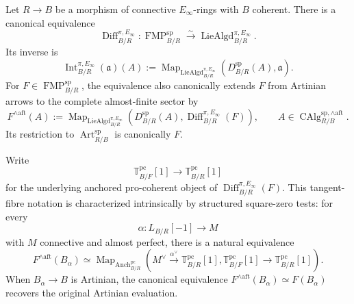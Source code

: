 \begin{theorem}
\label{thm:bnla-spectral-affine-recognition}
Let $R\to B$ be a morphism of connective $E_\infty$-rings with $B$ coherent.
There is a canonical equivalence
\[
\boxed{
    \operatorname{Diff}^{\pi,E_\infty}_{B/R}:
    \operatorname{FMP}^{\mathrm{sp}}_{B/R}
    \xrightarrow{\sim}
    \operatorname{LieAlgd}^{\pi,E_\infty}_{B/R}.}
\]
Its inverse is
\[
\boxed{
    \operatorname{Int}^{\pi,E_\infty}_{B/R}(\mathfrak a)(A)
    :=
    \operatorname{Map}_{\operatorname{LieAlgd}^{\pi,E_\infty}_{B/R}}
    \left(D^{\mathrm{sp}}_{B/R}(A),\mathfrak a\right).}
\]
For $F\in\operatorname{FMP}^{\mathrm{sp}}_{B/R}$, the equivalence also
canonically extends $F$ from Artinian arrows to the complete almost-finite
sector by
\[
\boxed{
    F^{\wedge\mathrm{aft}}(A)
    :=
    \operatorname{Map}_{\operatorname{LieAlgd}^{\pi,E_\infty}_{B/R}}
    \left(
        D^{\mathrm{sp}}_{B/R}(A),
        \operatorname{Diff}^{\pi,E_\infty}_{B/R}(F)
    \right),
    \qquad
    A\in\operatorname{CAlg}^{\mathrm{sp},\wedge\mathrm{aft}}_{R/B}.}
\]
Its restriction to $\operatorname{Art}^{\mathrm{sp}}_{R/B}$ is canonically
$F$.

Write
\[
\boxed{
    \mathbb T^{\mathrm{pc}}_{B/F}[1]
    \longrightarrow
    \mathbb T^{\mathrm{pc}}_{B/R}[1]}
\]
for the underlying anchored pro-coherent object of
$\operatorname{Diff}^{\pi,E_\infty}_{B/R}(F)$.  This tangent-fibre notation
is characterized intrinsically by structured square-zero tests: for every
\[
    \alpha:L_{B/R}[-1]\longrightarrow M
\]
with $M$ connective and almost perfect, there is a natural equivalence
\[
\boxed{
    F^{\wedge\mathrm{aft}}(B_\alpha)
    \simeq
    \operatorname{Map}_{\operatorname{Anch}^{\mathrm{pc}}_{B/R}}
    \left(
        M^\vee\xrightarrow{\alpha^\vee}
        \mathbb T^{\mathrm{pc}}_{B/R}[1],
        \mathbb T^{\mathrm{pc}}_{B/F}[1]
        \longrightarrow
        \mathbb T^{\mathrm{pc}}_{B/R}[1]
    \right).}
\]
When $B_\alpha\to B$ is Artinian, the canonical equivalence
$F^{\wedge\mathrm{aft}}(B_\alpha)\simeq F(B_\alpha)$ recovers the original
Artinian evaluation.
\end{theorem}

